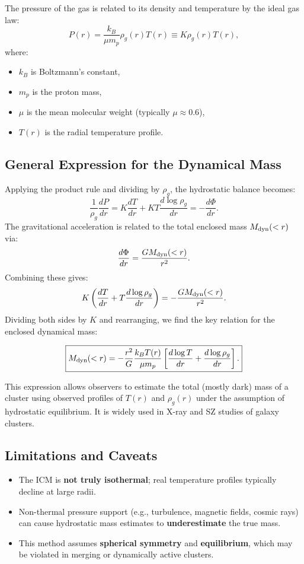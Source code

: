 The pressure of the gas is related to its density and temperature by the ideal gas law:
\[
P(r) = \frac{k_B}{\mu m_p} \rho_g(r) T(r) \equiv K \rho_g(r) T(r),
\]
where:
\begin{itemize}
    \item $k_B$ is Boltzmann’s constant,
    \item $m_p$ is the proton mass,
    \item $\mu$ is the mean molecular weight (typically $\mu \approx 0.6$),
    \item $T(r)$ is the radial temperature profile.
\end{itemize}

\subsection{General Expression for the Dynamical Mass}

Applying the product rule and dividing by $\rho_g$, the hydrostatic balance becomes:
\[
\frac{1}{\rho_g} \frac{dP}{dr} = K \frac{dT}{dr} + K T \frac{d\log \rho_g}{dr} = -\frac{d\Phi}{dr}.
\]
The gravitational acceleration is related to the total enclosed mass $M_{\rm dyn}(<r)$ via:
\[
\frac{d\Phi}{dr} = \frac{G M_{\rm dyn}(<r)}{r^2}.
\]
Combining these gives:
\[
K \left( \frac{dT}{dr} + T \frac{d\log \rho_g}{dr} \right) = -\frac{G M_{\rm dyn}(<r)}{r^2}.
\]
Dividing both sides by $K$ and rearranging, we find the key relation for the enclosed dynamical mass:
\begin{tcolorbox}[colback=blue!5!white, colframe=blue!75!black, title=Hydrostatic Mass Equation for the ICM]
\begin{equation}
\boxed{
M_{\rm dyn}(<r) = -\frac{r^2}{G} \frac{k_B T(r)}{\mu m_p} \left[ \frac{d\log T}{dr} + \frac{d\log \rho_g}{dr} \right].
}
\end{equation}
\end{tcolorbox}

This expression allows observers to estimate the total (mostly dark) mass of a cluster using observed profiles of $T(r)$ and $\rho_g(r)$ under the assumption of hydrostatic equilibrium. It is widely used in X-ray and SZ studies of galaxy clusters.

\subsection{Limitations and Caveats}

\begin{itemize}
    \item The ICM is \textbf{not truly isothermal}; real temperature profiles typically decline at large radii.
    \item Non-thermal pressure support (e.g., turbulence, magnetic fields, cosmic rays) can cause hydrostatic mass estimates to \textbf{underestimate} the true mass.
    \item This method assumes \textbf{spherical symmetry} and \textbf{equilibrium}, which may be violated in merging or dynamically active clusters.
\end{itemize}

